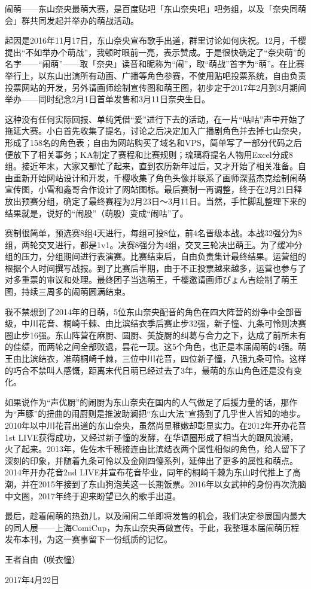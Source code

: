 %
%


闹萌——东山奈央最萌大赛，是百度贴吧「东山奈央吧」吧务组，以及「奈央同萌会」群共同发起并举办的萌战活动。

起因是2016年11月17日，东山奈央宣布歌手出道，群里讨论如何庆祝。12月，千樱提出“不如举办个萌战”，我顿时眼前一亮，表示赞成。于是很快确定了“奈央萌”的名字——“闹萌”——取{\mincho 「奈央」}读音和昵称为“闹”，取“萌战”首字为“萌”。在比赛举行上，以东山出演所有动画、广播等角色参赛，不使用贴吧投票系统，自由负责投票网站的开发，另外请画师绘制宣传图和萌王图，初步定于2017年2月到3月期间举办——同时纪念2月1日首单发售和3月11日奈央生日。

这种没有任何实际回报、单纯凭借“爱”进行下去的活动，在一片“咕咕”声中开始了拖延大赛。小白首先收集了提名，讨论之后决定加入广播剧角色并去掉七山奈央，形成了158名的角色表；自由为网站购买了域名和VPS，简单写了一部分代码之后便放下了相关事务；KA制定了赛程和比赛规则；琉璃将提名人物用Excel分成8组。接近年末，大家又都忙了起来，直到农历新年过后，又才开始了相关准备。自由重新开始网站设计和开发，千樱收集了角色头像并联系了画师深蓝杰克绘制闹萌宣传图，小雪和鑫哥合作设计了网站图标。最后赛制一再调整，终于在2月21日释放出预赛分组，确定了最终赛程为2月23日〜3月11日。当然，手忙脚乱整理下来的结果就是，说好的“闹股”（萌股）变成“闹咕”了。

赛制很简单，预选赛8组4天进行，每组可投8位，前4名晋级本战。本战32强分为8组，两轮交叉进行，都是1v1。决赛8强分为4组，交叉三轮决出萌王。为了缓冲分组的压力，分组期间进行表演赛。比赛结束后，自由负责集计最终结果。运营组的根据个人时间撰写战报。到了比赛后半期，由于不正投票越来越多，运营也参与了对多重票的审议和处理。最终团子当选萌王，千樱邀请画师{\mincho ぴょん吉}绘制了萌王图，持续三周多的闹萌圆满结束。

我不禁想到了2014年的日萌，5位东山奈央配音的角色在四大阵营的纷争中全部晋级，中川花音、桐崎千棘、由比滨结衣季后赛止步32强，新子憧、九条可怜则决赛圈止步16强。东山阵营在麻厨、圆厨、美旋厨的纠葛与合力之下，达成了前所未有的佳绩，而两轮之间全部败退，昙花一现。这5个角色，也正是本届闹萌的4强。萌王由比滨结衣，准萌桐崎千棘，三位中川花音，四位新子憧，八强九条可怜。这样的巧合不禁叫人感慨，距离末代日萌已经过去了3年，最萌的东山角色还是没有变化。

如果说作为“声优厨”的闹厨为东山奈央在国内的人气做足了后援力量的话，那作为“声豚”的扭曲的闹厨则是推波助澜把“东山大法”宣扬到了几乎世人皆知的地步。2010年以中川花音出道的东山奈央，虽然尚显稚嫩却彰显实力。在2012年开办花音1st LIVE获得成功，又经过新子憧的发酵，在华语圈形成了相当大的跟风浪潮，火了起来。2013年，佐佐木千穂接连由比滨结衣两个属性相似的角色，给人留下了深刻的印象，并随着九条可怜以及金刚四傻系列，延伸出了更多的属性和萌点。2014年开办花音2nd LIVE并宣布花音毕业，同年的桐崎千棘为东山时代推上了高潮，并在2015年接到了东山狗泡芙这一长期饭票。2016年以女武神的身份再次洗脑中文圈，2017年终于迎来盼望已久的歌手出道。

最后，趁着闹萌的热劲儿，以及闹闹二单即将发售的机会，我们决定参展国内最大的同人展——上海ComiCup，为东山奈央再做宣传。于此，我整理本届闹萌历程发布本刊，为这一赛事留下一份纸质的记忆。

\begin{flushright}
  \kasho 王者自由（咲衣憧）

  \kai 2017年4月22日
\end{flushright}
